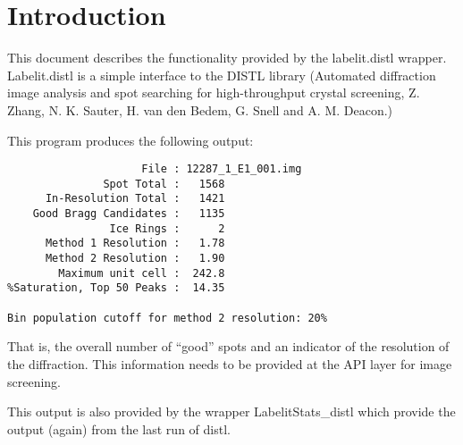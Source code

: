 \documentclass[a4paper, 11pt]{article}
\begin{document}
\section{Introduction}
This document describes the functionality provided by the labelit.distl
wrapper. Labelit.distl is a simple interface to the DISTL library 
(Automated diffraction image analysis and spot searching for 
high-throughput crystal screening, Z. Zhang, N. K. Sauter, 
H. van den Bedem, G. Snell and A. M. Deacon.)

This program produces the following output:

{
\tiny
\begin{verbatim}
                     File : 12287_1_E1_001.img
               Spot Total :   1568
      In-Resolution Total :   1421
    Good Bragg Candidates :   1135
                Ice Rings :      2
      Method 1 Resolution :   1.78
      Method 2 Resolution :   1.90
        Maximum unit cell :  242.8
%Saturation, Top 50 Peaks :  14.35

Bin population cutoff for method 2 resolution: 20%
\end{verbatim}
}

That is, the overall number of ``good'' spots and an indicator of the
resolution of the diffraction. This information needs to be provided at
the API layer for image screening.

This output is also provided by the wrapper LabelitStats\_distl which 
provide the output (again) from the last run of distl.
\end{document}
